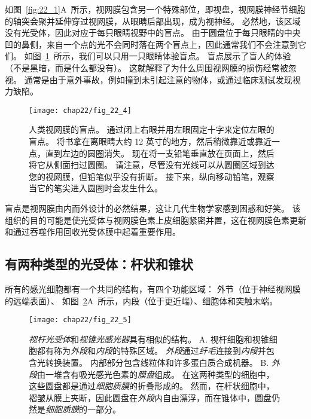 如图~\ref{fig:22_1}A~所示，视网膜包含另一个特殊部位，即视盘，视网膜神经节细胞的轴突会聚并延伸穿过视网膜，从眼睛后部出现，成为视神经。
必然地，该区域没有光受体，因此对应于每只眼睛视野中的盲点。
由于圆盘位于每只眼睛的中央凹的鼻侧，来自一个点的光不会同时落在两个盲点上，因此通常我们不会注意到它们。
如图~\ref{fig:22_4}~所示，我们可以只用一只眼睛体验盲点。
盲点展示了盲人的体验（不是黑暗，而是什么都没有）。
这就解释了为什么周围视网膜的损伤经常被忽视。
通常是由于意外事故，例如撞到未引起注意的物体，或通过临床测试发现视力缺陷。


\begin{figure}[htbp]
	\centering
	\texttt{[image: chap22/fig\_22\_4]}
	\caption{人类视网膜的盲点。
		通过闭上右眼并用左眼固定十字来定位左眼的盲点。
		将书拿在离眼睛大约 12 英寸的地方，然后稍微靠近或靠近一点，直到左边的圆圈消失。 
		现在将一支铅笔垂直放在页面上，然后将它从侧面扫过圆圈。 
		请注意，尽管没有光线可以从圆圈区域到达您的视网膜，但铅笔似乎没有折断。 
		接下来，纵向移动铅笔，观察当它的笔尖进入圆圈时会发生什么\cite{hurvich1981color}。}
	\label{fig:22_4}
\end{figure}


盲点是视网膜由内而外设计的必然结果，这让几代生物学家感到困惑和好笑。
该组织的目的可能是使光受体与视网膜色素上皮细胞紧密并置，这在视网膜色素更新和通过吞噬作用回收光受体膜中起着重要作用。


\subsection{有两种类型的光受体：杆状和锥状}

所有的感光细胞都有一个共同的结构，有四个功能区域：
外节（位于神经视网膜的远端表面）、
如图~\ref{fig:22_5}A~所示，内段（位于更近端）、细胞体和突触末端。


\begin{figure}[htbp]
	\centering
	\texttt{[image: chap22/fig\_22\_5]}
	\caption{\textit{视杆光受体}和\textit{视锥光感光器}具有相似的结构。
		A. 视杆细胞和视锥细胞都有称为\textit{外段}和\textit{内段}的特殊区域。
		\textit{外段}通过\textit{纤毛}连接到\textit{内段}并包含光转换装置。
		内部部分包含线粒体和许多蛋白质合成机器。
		B. \textit{外段}由一堆含有吸光感光色素的\textit{膜盘}组成。
		在这两种类型的细胞中，这些圆盘都是通过\textit{细胞质膜}的折叠形成的。
		然而，在杆状细胞中，褶皱从膜上夹断，因此圆盘在\textit{外段}内自由漂浮，而在锥体中，圆盘仍然是\textit{细胞质膜}的一部分\cite{o1982chemistry,young1970visual}。}
	\label{fig:22_5}
\end{figure}



